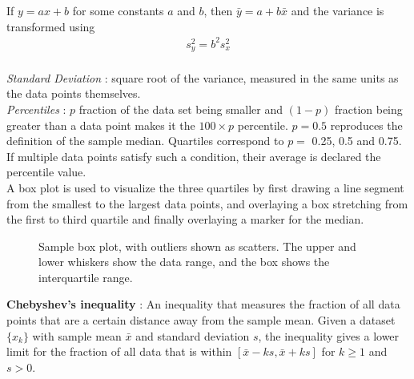 If $ y = ax + b $ for some constants $ a $ and $ b $, then $ \bar{y} = a + b \bar{x} $ and the variance is transformed using
\begin{align}
	s_{y}^{2} = b^{2} s_{x}^{2}
\end{align} \\

\textit{Standard Deviation} : square root of the variance, measured in the same units as the data points themselves. \\

\textit{Percentiles} : $ p $ fraction of the data set being smaller and $ (1 - p) $ fraction being greater than a data point makes it the $ 100 \times p $ percentile. $ p = 0.5 $ reproduces the definition of the sample median. Quartiles correspond to $ p = $ 0.25, 0.5 and 0.75. If multiple data points satisfy such a condition, their average is declared the percentile value. \\

 A box plot is used to visualize the three quartiles by first drawing a line segment from the smallest to the largest data points, and overlaying a box stretching from the first to third quartile and finally overlaying a marker for the median. \\

\begin{figure}
	\centering
	\caption{Sample box plot, with outliers shown as scatters. The upper and lower whiskers show the data range, and the box shows the interquartile range.}
\end{figure}

\textbf{Chebyshev's inequality} : An inequality that measures the fraction of all data points that are a certain distance away from the sample mean. Given a dataset $ \{x_k\} $ with sample mean $ \bar{x} $ and standard deviation $ s $, the inequality gives a lower limit for the fraction of all data that is within $ [ \bar{x} - ks, \bar{x} + ks ] $ for $ k \geq 1$ and $ s > 0 $. \\

